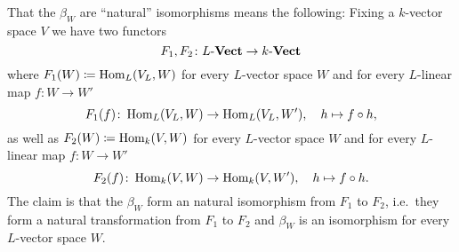 That the $\beta_W$ are ``natural'' isomorphisms means the following:
Fixing a $k$-vector space $V$ we have two functors
\[
          F_1, F_2
  \colon  L\text{-}\mathbf{Vect}
  \to     k\text{-}\mathbf{Vect}
\]
where $F_1(W) \coloneqq \operatorname{Hom}_L(V_L,W)$ for every $L$-vector space $W$ and for every $L$-linear map $f \colon W \to W'$
\[
          F_1(f)
  \colon  \operatorname{Hom}_L(V_L, W)
  \to     \operatorname{Hom}_L(V_L, W'),
  \quad   h
  \mapsto f \circ h,
\]
as well as $F_2(W) \coloneqq \operatorname{Hom}_k(V,W)$ for every $L$-vector space $W$ and for every $L$-linear map $f \colon W \to W'$
\[
          F_2(f)
  \colon  \operatorname{Hom}_k(V,W)
  \to     \operatorname{Hom}_k(V,W'),
  \quad   h
  \mapsto f \circ h.
\]
The claim is that the $\beta_W$ form an natural isomorphism from $F_1$ to $F_2$, i.e.\ they form a natural transformation from $F_1$ to $F_2$ and $\beta_W$ is an isomorphism for every $L$-vector space $W$.


